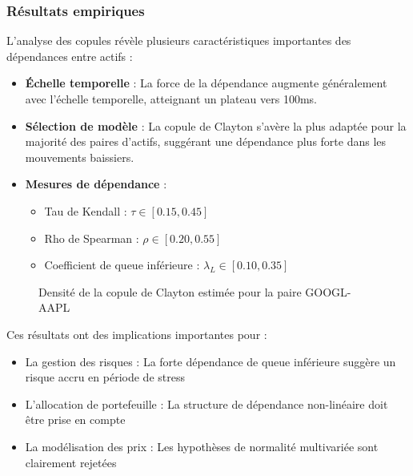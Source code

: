 \documentclass[12pt,a4paper]{article}
\theoremstyle{definition}
\theoremstyle{remark}
\begin{document}
\subsubsection{Résultats empiriques}

L'analyse des copules révèle plusieurs caractéristiques importantes des dépendances entre actifs :

\begin{itemize}
    \item \textbf{Échelle temporelle} : La force de la dépendance augmente généralement avec l'échelle temporelle, atteignant un plateau vers 100ms.
    
    \item \textbf{Sélection de modèle} : La copule de Clayton s'avère la plus adaptée pour la majorité des paires d'actifs, suggérant une dépendance plus forte dans les mouvements baissiers.
    
    \item \textbf{Mesures de dépendance} :
    \begin{itemize}
        \item Tau de Kendall : $\tau \in [0.15, 0.45]$
        \item Rho de Spearman : $\rho \in [0.20, 0.55]$
        \item Coefficient de queue inférieure : $\lambda_L \in [0.10, 0.35]$
    \end{itemize}
\end{itemize}

\begin{figure}[h!]
    \centering
    \caption{Densité de la copule de Clayton estimée pour la paire GOOGL-AAPL}
\end{figure}

Ces résultats ont des implications importantes pour :
\begin{itemize}
    \item La gestion des risques : La forte dépendance de queue inférieure suggère un risque accru en période de stress
    \item L'allocation de portefeuille : La structure de dépendance non-linéaire doit être prise en compte
    \item La modélisation des prix : Les hypothèses de normalité multivariée sont clairement rejetées
\end{itemize}
\end{document}
